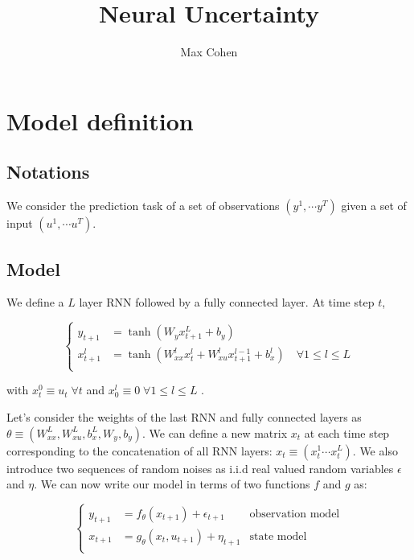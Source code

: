 \documentclass[10pt,a4paper]{report}
\begin{document}
\title{Neural Uncertainty}
\author{Max Cohen}

\chapter{Model definition}
\section{Notations}
We consider the prediction task of a set of observations $(y^1, \cdots y^T)$ given a set of input $(u^1, \cdots u^T)$.

\section{Model}
We define a $L$ layer RNN followed by a fully connected layer. At time step $t$,

\begin{equation*}
    \left\{
    \begin{aligned}
        y_{t+1}   & = \tanh(W_y x_{t+1}^L + b_y)                                                               \\
        x_{t+1}^l & = \tanh(W_{xx}^l x^{l}_{t} + W_{xu}^l x^{l-1}_{t+1} + b_x^l) \quad \forall 1 \leq l \leq L \\
    \end{aligned}
    \right.
\end{equation*}

with $x_{t}^0 \equiv u_{t} \; \forall t$ and $x_{0}^l \equiv 0 \; \forall 1 \leq l \leq L$ .

Let's consider the weights of the last RNN and fully connected layers as $\theta \equiv (W_{xx}^L, W_{xu}^L, b_x^L, W_y, b_y)$. We can define a new matrix $x_t$ at each time step corresponding to the concatenation of all RNN layers: $x_t \equiv (x_t^1 \cdots x_t^L)$. We also introduce two sequences of random noises as i.i.d real valued random variables $\epsilon$ and $\eta$. We can now write our model in terms of two functions $f$ and $g$ as:

\begin{equation}
    \left\{
    \begin{aligned}
        y_{t+1} & = f_\theta(x_{t+1}) + \epsilon_{t+1}    & \text{observation model} \\
        x_{t+1} & = g_\theta(x_{t}, u_{t+1}) + \eta_{t+1} & \text{state model}       \\
    \end{aligned}
    \right.
\end{equation}
\end{document}
